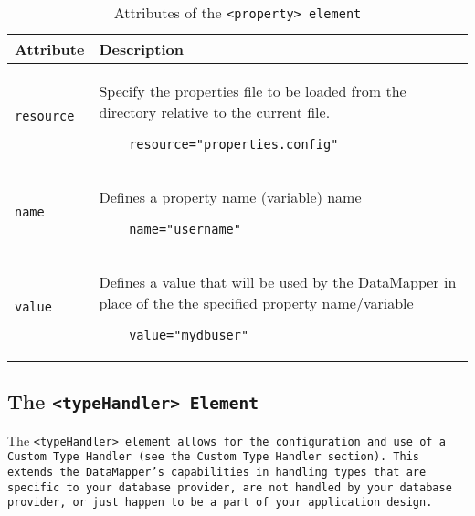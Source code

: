\begin{table}[!hpt]
\caption{Attributes of the \tt{<property>} element} \label{table:4.3}
\centering
\begin{tabular}{|l|l|}
 \hline
 \textbf{Attribute} & \textbf{Description} \\
 \hline
 \tt{resource} &
 \begin{minipage}{0.7\textwidth}\vspace{2mm}
    Specify the properties file to be loaded from the directory relative to
    the current file.
    \vspace{-3mm}\begin{verbatim}
    resource="properties.config"
    \end{verbatim}\vspace{-5mm}
  \end{minipage}
  \\
  \hline
%
 \tt{name} &
  \begin{minipage}{0.7\textwidth}\vspace{2mm}
   Defines a property name (variable) name
    \vspace{-3mm}\begin{verbatim}
    name="username"
    \end{verbatim}\vspace{-5mm}
  \end{minipage}
  \\
  \hline
%
 \tt{value} &
  \begin{minipage}{0.7\textwidth}\vspace{2mm}
   Defines a value that will be used by the DataMapper in place of the
   the specified property name/variable
    \vspace{-3mm}\begin{verbatim}
    value="mydbuser"
    \end{verbatim}\vspace{-5mm}
  \end{minipage}
  \\
  \hline
\end{tabular}
\end{table}

\subsection{The \tt{<typeHandler>} Element}
The \tt{<typeHandler>} element allows for the configuration and use of a
Custom Type Handler (see the Custom Type Handler section). This extends the
DataMapper's capabilities in handling types that are specific to your database
provider, are not handled by your database provider, or just happen to be a
part of your application design.

